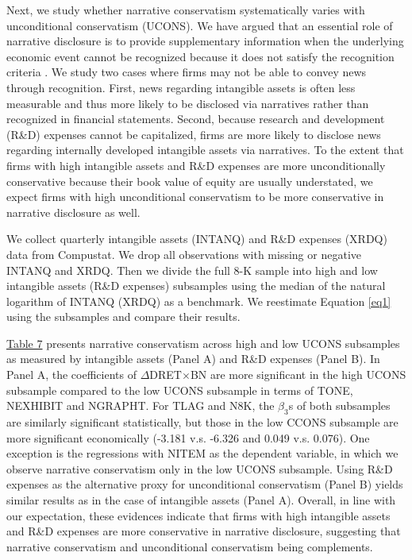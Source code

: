 \documentclass[letterpaper,12pt]{article}
\begin{document}
\begin{spacing}{1.5}
Next, we study whether narrative conservatism systematically varies with unconditional conservatism (UCONS). We have argued that an essential role of narrative disclosure is to provide supplementary information when the underlying economic event cannot be recognized because it does not satisfy the recognition criteria \cite{fasbStatementFinancialAccounting1984}. We study two cases where firms may not be able to convey news through recognition. First, news regarding intangible assets is often less measurable and thus more likely to be disclosed via narratives rather than recognized in financial statements. Second, because research and development (R\&D) expenses cannot be capitalized, firms are more likely to disclose news regarding internally developed intangible assets via narratives. To the extent that firms with high intangible assets and R\&D expenses are more unconditionally conservative because their book value of equity are usually understated, we expect firms with high unconditional conservatism to be more conservative in narrative disclosure as well.

We collect quarterly intangible assets (INTANQ) and R\&D expenses (XRDQ) data from Compustat. We drop all observations with missing or negative INTANQ and XRDQ. Then we divide the full 8-K sample into high and low intangible assets (R\&D expenses) subsamples using the median of the natural logarithm of INTANQ (XRDQ) as a benchmark. We reestimate Equation \eqref{eq1} using the subsamples and compare their results.

\hyperref[T7]{Table 7} presents narrative conservatism across high and low UCONS subsamples as measured by intangible assets (Panel A) and R\&D expenses (Panel B). In Panel A, the coefficients of $\Delta$DRET$\times$BN are more significant in the high UCONS subsample compared to the low UCONS subsample in terms of TONE, NEXHIBIT and NGRAPHT. For TLAG and N8K, the $\beta_3$s of both subsamples are similarly significant statistically, but those in the low CCONS subsample are more significant economically (-3.181 v.s. -6.326 and 0.049 v.s. 0.076). One exception is the regressions with NITEM as the dependent variable, in which we observe narrative conservatism only in the low UCONS subsample. Using R\&D expenses as the alternative proxy for unconditional conservatism (Panel B) yields similar results as in the case of intangible assets (Panel A). Overall, in line with our expectation, these evidences indicate that firms with high intangible assets and R\&D expenses are more conservative in narrative disclosure, suggesting that narrative conservatism and unconditional conservatism being complements.


\end{spacing}
\end{document}
